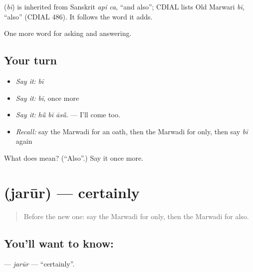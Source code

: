 \begin{cousinweb}
\textbf{} (\emph{bī}) is inherited from Sanskrit \emph{api ca}, \textquotedblleft{}and also\textquotedblright{}; CDIAL lists Old Marwari \emph{bī}, \textquotedblleft{}also\textquotedblright{} (CDIAL 486). It follows the word it adds.
\end{cousinweb}

\begin{grammarlens}[title={What you've built}]
One more word for asking and answering.
\end{grammarlens}

\subsection*{Your turn}
\begin{itemize}
\raggedright
  \item \emph{Say it:} \emph{bī}
  \item \emph{Say it:} \emph{bī}, once more
  \item \emph{Say it:} \emph{hū̃ bī āsū̃.} — I'll come too.
  \item \emph{Recall:} say the Marwadi for an oath, then the Marwadi for only, then say \emph{bī} again
\end{itemize}

\begin{tcolorbox}[breakable,colback=teal!4,colframe=teal!35!black,title={Before you move on}]
What does  mean? (\textquotedblleft{}Also\textquotedblright{}.) Say it once more.
\end{tcolorbox}
\section[\texorpdfstring{\mw{जरूर} (jarūr)}{जरूर (jarūr)}]{ (jarūr) — certainly}

\label{lesson:MW-C272-jarur}



\begin{quote}
Before the new one: say the Marwadi for only, then the Marwadi for also.
\end{quote}

\subsection*{You'll want to know: }
\textbf{} — \emph{jarūr} — \textquotedblleft{}certainly\textquotedblright{}.

